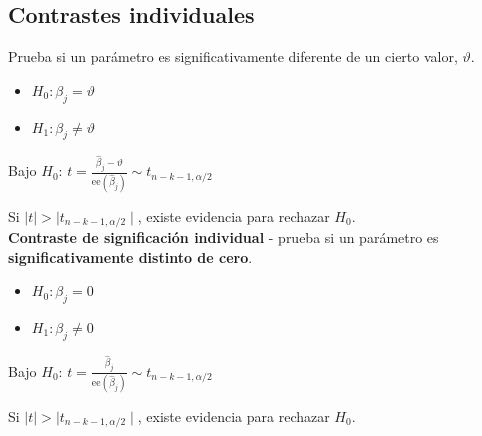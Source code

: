 \documentclass[10pt, a4paper, landscape]{extarticle}
\newcommand{\ee}{\mathrm{ee}}
\begin{document}
\begin{multicols}{3}
	\subsection*{Contrastes individuales}
		Prueba si un parámetro es significativamente diferente de un cierto valor, $\vartheta$.
		\begin{itemize}[leftmargin=*]
			\item $H_0: \beta_j = \vartheta$
			\item $H_1: \beta_j \neq \vartheta$
		\end{itemize}
		\begin{center}
			Bajo $H_0$: \quad
			$t = \frac{\hat{\beta}_j - \vartheta}{\ee(\hat{\beta}_j)} \sim t_{n-k-1, \alpha/2}$
		\end{center}
		Si $\mid t \mid > \mid t_{n-k-1, \alpha/2} \mid$, existe evidencia para rechazar $H_0$. \\
		\textbf{Contraste de significación individual} - prueba si un parámetro es \textbf{significativamente distinto de cero}.
		\begin{itemize}[leftmargin=*]
			\item $H_0: \beta_j = 0$
			\item $H_1: \beta_j \neq 0$
		\end{itemize}
		\begin{center}
			Bajo $H_0$: \quad
			$t = \frac{\hat{\beta}_j}{\ee(\hat{\beta}_j)} \sim t_{n-k-1, \alpha/2}$
		\end{center}
		Si $\mid t \mid > \mid t_{n-k-1, \alpha/2} \mid$, existe evidencia para rechazar $H_0$.

\end{multicols}
\end{document}
